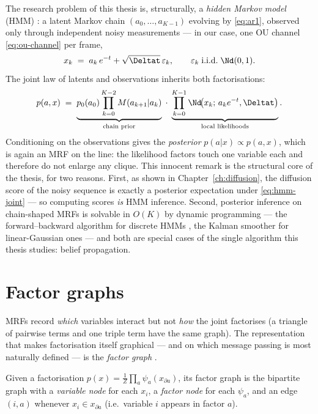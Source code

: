 The research problem of this thesis is, structurally, a \emph{hidden Markov
model} (HMM) \citep{rabiner1989tutorial}: a latent Markov chain
$(a_0, \dots, a_{K-1})$ evolving by \eqref{eq:ar1}, observed only through
independent noisy measurements --- in our case, one OU channel
\eqref{eq:ou-channel} per frame,
\begin{equation}
  x_k \;=\; a_k\, e^{-t} + \sqrt{\Deltat}\,\varepsilon_k,
  \qquad \varepsilon_k \;\text{i.i.d.}\; \Nd(0,1) .
  \label{eq:hmm-observation}
\end{equation}
The joint law of latents and observations inherits both factorisations:
\begin{equation}
  p(a, x)
  \;=\; \underbrace{p_0(a_0) \prod_{k=0}^{K-2} M(a_{k+1}|a_k)}_{\text{chain prior}}
  \;\cdot\;
  \underbrace{\prod_{k=0}^{K-1} \Nd\!\big(x_k;\, a_k e^{-t}, \Deltat\big)}_{\text{local likelihoods}} .
  \label{eq:hmm-joint}
\end{equation}
Conditioning on the observations gives the \emph{posterior}
$p(a | x) \propto p(a, x)$, which is again an MRF on the line: the
likelihood factors touch one variable each and therefore do not enlarge any
clique. This innocent remark is the structural core of the thesis, for two
reasons. First, as shown in Chapter~\ref{ch:diffusion}, the diffusion score
of the noisy sequence is exactly a posterior expectation under
\eqref{eq:hmm-joint} --- so computing scores \emph{is} HMM inference.
Second, posterior inference on chain-shaped MRFs is solvable in $O(K)$ by
dynamic programming --- the forward--backward algorithm for discrete HMMs
\citep{rabiner1989tutorial}, the Kalman smoother for linear-Gaussian ones
\citep{kalman1960new, rauch1965maximum} --- and both are special cases of
the single algorithm this thesis studies: belief propagation.

\section{Factor graphs}\label{sec:factor-graphs}

MRFs record \emph{which} variables interact but not \emph{how} the joint
factorises (a triangle of pairwise terms and one triple term have the same
graph). The representation that makes factorisation itself graphical --- and
on which message passing is most naturally defined --- is the \emph{factor
graph} \citep{kschischang2001factor}.

\begin{definition}
Given a factorisation $p(x) = \frac{1}{Z}\prod_{a} \psi_a(x_{\partial a})$,
its factor graph is the bipartite graph with a \emph{variable node} for each
$x_i$, a \emph{factor node} for each $\psi_a$, and an edge $(i, a)$ whenever
$x_i \in x_{\partial a}$ (i.e.\ variable $i$ appears in factor $a$).
\end{definition}

